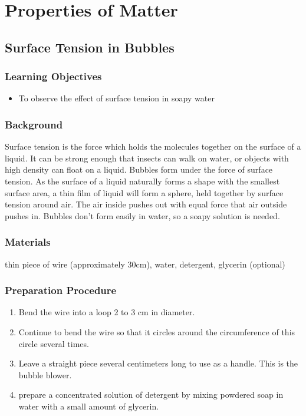 \section{Properties of Matter}

\subsection{Surface Tension in Bubbles}

\subsubsection*{Learning Objectives}
\begin{itemize}
\item{To observe the effect of surface tension in soapy water}
\end{itemize}

\subsubsection*{Background}
Surface tension is the force which holds the molecules together on the surface of a liquid.  It can be strong enough that insects can walk on water, or objects with high density can float on a liquid.  Bubbles form under the force of surface tension.  As the surface of a liquid naturally forms a shape with the smallest surface area, a thin film of liquid will form a sphere, held together by surface tension around air.  The air inside pushes out with equal force that air outside pushes in.  Bubbles don't form easily in water, so a soapy solution is needed.

\subsubsection*{Materials}
thin piece of wire (approximately 30cm), water, detergent, glycerin (optional)

\subsubsection*{Preparation Procedure}
\begin{enumerate}
\item{Bend the wire into a loop 2 to 3 cm in diameter.}
\item{Continue to bend the wire so that it circles around the circumference of this circle several times.}
\item{Leave a straight piece several centimeters long to use as a handle.  This is the bubble blower.}
\item{prepare a concentrated solution of detergent by mixing powdered soap in water with a small amount of glycerin.}
\end{enumerate}

